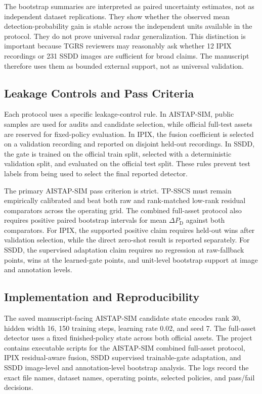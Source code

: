 \documentclass[journal]{IEEEtran}
\begin{document}
The bootstrap summaries are interpreted as paired uncertainty estimates, not as independent dataset replications. They show whether the observed mean detection-probability gain is stable across the independent units available in the protocol. They do not prove universal radar generalization. This distinction is important because TGRS reviewers may reasonably ask whether 12 IPIX recordings or 231 SSDD images are sufficient for broad claims. The manuscript therefore uses them as bounded external support, not as universal validation.

\subsection{Leakage Controls and Pass Criteria}

Each protocol uses a specific leakage-control rule. In AISTAP-SIM, public samples are used for audits and candidate selection, while official full-test assets are reserved for fixed-policy evaluation. In IPIX, the fusion coefficient is selected on a validation recording and reported on disjoint held-out recordings. In SSDD, the gate is trained on the official train split, selected with a deterministic validation split, and evaluated on the official test split. These rules prevent test labels from being used to select the final reported detector.

The primary AISTAP-SIM pass criterion is strict. TP-SSCS must remain empirically calibrated and beat both raw and rank-matched low-rank residual comparators across the operating grid. The combined full-asset protocol also requires positive paired bootstrap intervals for mean $\Delta P_{\mathrm{D}}$ against both comparators. For IPIX, the supported positive claim requires held-out wins after validation selection, while the direct zero-shot result is reported separately. For SSDD, the supervised adaptation claim requires no regression at raw-fallback points, wins at the learned-gate points, and unit-level bootstrap support at image and annotation levels.

\subsection{Implementation and Reproducibility}

The saved manuscript-facing AISTAP-SIM candidate state encodes rank 30, hidden width 16, 150 training steps, learning rate 0.02, and seed 7. The full-asset detector uses a fixed finished-policy state across both official assets. The project contains executable scripts for the AISTAP-SIM combined full-asset protocol, IPIX residual-aware fusion, SSDD supervised trainable-gate adaptation, and SSDD image-level and annotation-level bootstrap analysis. The logs record the exact file names, dataset names, operating points, selected policies, and pass/fail decisions.
\end{document}

